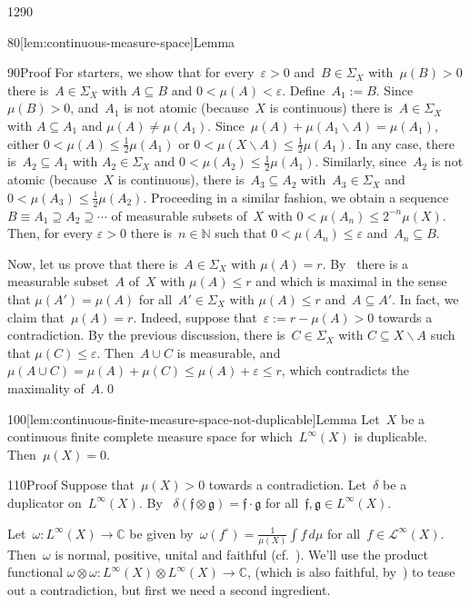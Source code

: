 \begin{parsec}{1290}
\begin{point}{80}[lem:continuous-measure-space]{Lemma}
\begin{point}{90}{Proof}
For starters, we show that for every~$\varepsilon >0$
and~$B\in\Sigma_X$ with~$\mu(B)>0$
there is~$A\in\Sigma_X$ with $A\subseteq B$
and  $0<\mu(A)<\varepsilon$.
Define~$A_1 := B$.
Since~$\mu(B)>0$,
and~$A_1$ is not atomic (because~$X$ is continuous)
there is~$A\in\Sigma_X$ with $A\subseteq A_1$ 
and $\mu(A)\neq \mu(A_1)$.
Since~$\mu(A)+\mu(A_1\backslash A)=\mu(A_1)$,
either $0<\mu(A)\leq \frac{1}{2}\mu(A_1)$
or $0<\mu(X\backslash A)\leq \frac{1}{2}\mu(A_1)$.
In any case,
there is~$A_2\subseteq A_1$
with $A_2\in\Sigma_X$
and $0<\mu(A_2)\leq \frac{1}{2}\mu(A_1)$.
Similarly,
since~$A_2$ is not atomic (because~$X$ is continuous),
there is~$A_3\subseteq A_2$
with~$A_3\in\Sigma_X$ and $0<\mu(A_3)\leq \frac{1}{2}\mu(A_2)$.
Proceeding in a similar fashion,
we obtain a sequence $B\equiv A_1 \supseteq A_2\supseteq \dotsb$
of measurable subsets of~$X$
with $0<\mu(A_n)\leq 2^{-n}\mu(X)$.
Then, for every $\varepsilon >0$
there is~$n\in\mathbb{N}$
such that $0<\mu(A_n)\leq \varepsilon$ and~$A_n\subseteq B$.

Now, 
let us prove that there is~$A\in\Sigma_X$ with $\mu(A)=r$.
By~
there is a measurable
subset~$A$ of~$X$
with $\mu(A)\leq r$
and which is maximal
in the sense that $\mu(A')=\mu(A)$
for all~$A'\in\Sigma_X$
with $\mu(A)\leq r$ and~$A\subseteq A'$.
In fact, we claim that~$\mu(A)=r$.
Indeed, suppose that~$\varepsilon := r-\mu(A)>0$
towards a contradiction.
By the previous discussion,
there is~$C\in\Sigma_X$ with $C\subseteq X\backslash A$
such that $\mu(C)\leq \varepsilon$.
Then~$A\cup C$ is measurable,
and $\mu(A\cup C)=\mu(A)+\mu(C)\leq \mu(A)+\varepsilon\leq r$,
which contradicts the maximality of~$A$.\qed
\end{point}
\end{point}
\begin{point}{100}[lem:continuous-finite-measure-space-not-duplicable]{Lemma}%
Let~$X$ be a continuous finite complete measure space
for which~$L^\infty(X)$ is duplicable.
Then~$\mu(X)=0$.
\begin{point}{110}{Proof}%
Suppose that~$\mu(X)>0$
towards a contradiction.
Let~$\delta$
be a duplicator
on~$L^\infty(X)$.
By~
$\delta(\mathfrak{f}\otimes \mathfrak{g})=
\mathfrak{f}\cdot \mathfrak{g}$ for 
all~$\mathfrak{f},\mathfrak{g}\in L^\infty(X)$.

Let~$\omega\colon L^\infty(X)\to \mathbb{C}$
be given by~$\omega(f^\circ)=\frac{1}{\mu(X)}\int f \,d\mu$
for all~$f\in \mathcal{L}^\infty(X)$.
Then~$\omega$ is normal, positive, unital and faithful
(cf.~).
We'll use
the product
functional 
$\omega\otimes \omega\colon L^\infty(X)\otimes L^\infty(X)\to \mathbb{C}$,
(which is also faithful,
by~)
to tease out a contradiction,
but first we  need a second ingredient.


\end{point}
\end{point}
\end{parsec}
